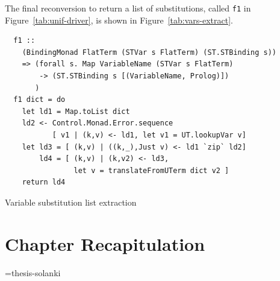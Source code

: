 \documentclass[thesis-solanki.tex]{subfiles}
\begin{document}
The final reconversion to return a list of substitutions,
  called \texttt{f1} in Figure~\ref{tab:unif-driver}, is shown in
  Figure~\ref{tab:vars-extract}.
\begin{code-list}
  \begin{verbatim}
  f1 ::
    (BindingMonad FlatTerm (STVar s FlatTerm) (ST.STBinding s))
    => (forall s. Map VariableName (STVar s FlatTerm)
        -> (ST.STBinding s [(VariableName, Prolog)])
       )
  f1 dict = do
    let ld1 = Map.toList dict
    ld2 <- Control.Monad.Error.sequence
           [ v1 | (k,v) <- ld1, let v1 = UT.lookupVar v]
    let ld3 = [ (k,v) | ((k,_),Just v) <- ld1 `zip` ld2]
        ld4 = [ (k,v) | (k,v2) <- ld3,
                let v = translateFromUTerm dict v2 ]
    return ld4
  \end{verbatim}
  \vspace*{-1.0\baselineskip}
  \caption{Variable substitution list extraction}
  \label{tab:vars-extract}
\end{code-list}

\clearpage
\section{Chapter Recapitulation}

\if\jobname={thesis-solanki}\else
\begin{scope}
  \nolinenumbers
  \enotesize
  \par
  \begin{singlespace}
  \setlength{\parskip}{12pt plus 2pt minus 1pt}
  \theendnotes
  \par
  \end{singlespace}
\end{scope}
\fi
\end{document}
